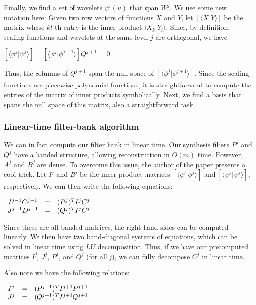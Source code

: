 \documentclass[11pt]{article}
\begin{document}
Finally, we find a set of wavelets $\psi^{j}(u)$ that span $W^{j}$. We use some new notation here: Given two row vectors of functions $X$ and $Y$, let $[ \langle X\; Y \rangle ]$ be the matrix whose $kl$-th entry is the inner product $\langle X_{k} \; Y_{l} \rangle$. Since, by definition, scaling functions and wavelets at the same level $j$ are orthogonal, we have
\begin{center}
$[ \langle \phi^{j} | \psi^{j} \rangle ] = [ \langle \phi^{j} | \phi^{j + 1} \rangle ] Q^{j + 1} = 0$
\end{center}
Thus, the columns of $Q^{j+1}$ span the null space of $[ \langle \phi^{j} | \phi^{j + 1} \rangle ]$. Since the scaling functions are piecewise-polynomial functions, it is straightforward to compute the entries of the matrix of inner products symbolically. Next, we find a basis that spans the null space of this matrix, also a straightforward task.

\subsubsection{Linear-time filter-bank algorithm}
\label{sec:lineartime}
We can in fact compute our filter bank in linear time. Our synthesis filters $P^{j}$ and $Q^{j}$ have a banded structure, allowing reconstruction in $O(m)$ time. However, $A^{j}$ and $B^{j}$ are dense. To overcome this issue, the author of the paper presents a cool trick. Let $I^{j}$ and $B^{j}$ be the inner product matrices $[ \langle \phi^{j} | \phi^{j} \rangle ]$ and $[ \langle \psi^{j} | \psi^{j} \rangle ]$, respectively. We can then write the following equations:
\begin{center}
$\begin{array}{c c c}
I^{j-1} C^{j-1} & = & (P^{j})^{T} I^{j} C^{j}\\
J^{j-1} D^{j-1} & = & (Q^{j})^{T} I^{j} C^{j}\\
\end{array}$
\end{center}
Since these are all banded matrices, the right-hand sides can be computed linearly. We then have two band-diagonal systems of equations, which can be solved in linear time using $LU$ decomposition. Thus, if we have our precomputed matrices $I^{j}$, $J^{j}$, $P^{j}$, and $Q^{j}$ (for all $j$), we can fully decompose $C^{j}$ in linear time.

Also note we have the following relations:
\begin{center}
$\begin{array}{c c c}
I^{j} & = & (P^{j+1})^{T} I^{j+1} P^{j+1}\\
J^{j} & = & (Q^{j+1})^{T} I^{j+1} Q^{j+1}\\
\end{array}$
\end{center}
\end{document}
